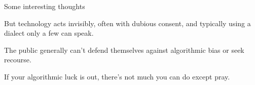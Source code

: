 \documentclass[presentation]{subfiles}
\begin{document}
\begin{frame}{Some interesting thoughts}

But technology acts invisibly, often with dubious consent, and typically using a dialect only a few can speak.

The public generally can’t defend themselves against algorithmic bias or seek recourse.


If your algorithmic luck is out, there’s not much you can do except pray.


\end{frame}
\end{document}
